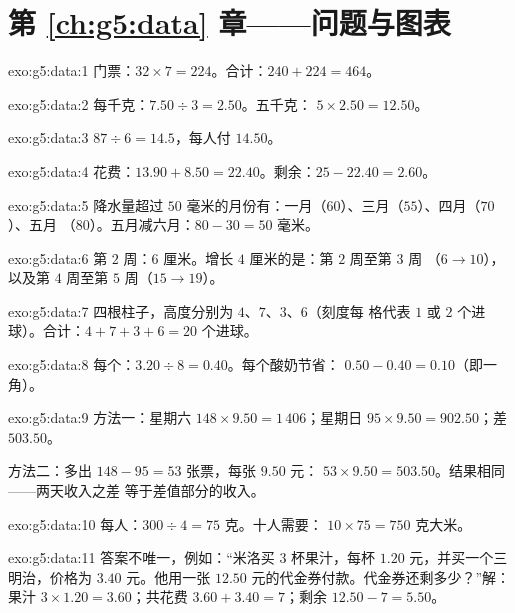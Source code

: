 \section*{第 \ref{ch:g5:data} 章——问题与图表}

\begin{solution}{exo:g5:data:1}
门票：$32 \times 7 = 224$。合计：$240 + 224 = 464$。
\end{solution}

\begin{solution}{exo:g5:data:2}
每千克：$7.50 \div 3 = 2.50$。五千克：
$5 \times 2.50 = 12.50$。
\end{solution}

\begin{solution}{exo:g5:data:3}
$87 \div 6 = 14.5$，每人付 $14.50$。
\end{solution}

\begin{solution}{exo:g5:data:4}
花费：$13.90 + 8.50 = 22.40$。剩余：$25 - 22.40 = 2.60$。
\end{solution}

\begin{solution}{exo:g5:data:5}
降水量超过 $50$ 毫米的月份有：一月（$60$）、三月（$55$）、四月（$70$）、五月
（$80$）。五月减六月：$80 - 30 = 50$ 毫米。
\end{solution}

\begin{solution}{exo:g5:data:6}
第 $2$ 周：$6$ 厘米。增长 $4$ 厘米的是：第 $2$ 周至第 $3$ 周
（$6 \to 10$），以及第 $4$ 周至第 $5$ 周（$15 \to 19$）。
\end{solution}

\begin{solution}{exo:g5:data:7}
四根柱子，高度分别为 $4$、$7$、$3$、$6$（刻度每
格代表 $1$ 或 $2$ 个进球）。合计：$4 + 7 + 3 + 6 = 20$ 个进球。
\end{solution}

\begin{solution}{exo:g5:data:8}
每个：$3.20 \div 8 = 0.40$。每个酸奶节省：
$0.50 - 0.40 = 0.10$（即一角）。
\end{solution}

\begin{solution}{exo:g5:data:9}
方法一：星期六 $148 \times 9.50 = 1\,406$；星期日
$95 \times 9.50 = 902.50$；差 $503.50$。

方法二：多出 $148 - 95 = 53$ 张票，每张 $9.50$ 元：
$53 \times 9.50 = 503.50$。结果相同——两天收入之差
等于差值部分的收入。
\end{solution}

\begin{solution}{exo:g5:data:10}
每人：$300 \div 4 = 75$ 克。十人需要：
$10 \times 75 = 750$ 克大米。
\end{solution}

\begin{solution}{exo:g5:data:11}
答案不唯一，例如：“米洛买 $3$ 杯果汁，每杯
$1.20$ 元，并买一个三明治，价格为 $3.40$ 元。他用一张 $12.50$
元的代金券付款。代金券还剩多少？”解：果汁
$3 \times 1.20 = 3.60$；共花费 $3.60 + 3.40 = 7$；剩余
$12.50 - 7 = 5.50$。
\end{solution}
